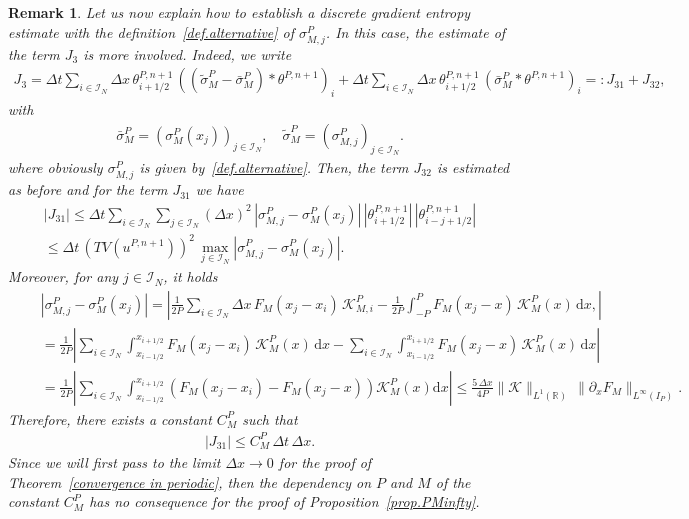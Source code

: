 \documentclass[11pt]{amsart}
\newtheorem{remark}{Remark}
\newcommand{\K}{\mathcal{K}}
\newcommand{\dd}{\mathrm{d}}
\newcommand{\pa}{\partial}
\newcommand{\R}{\mathbb{R}}
\newcommand{\I}{\mathcal{I}_N}
\begin{document}
\begin{remark}\label{rem.alter2}
Let us now explain how to establish a discrete gradient entropy estimate with the definition~\eqref{def.alternative} of $\sigma^P_{M,j}$. In this case, the estimate of the term $J_3$ is more involved. Indeed, we write
\begin{align*}
    J_3 = \Delta t \sum_{i\in\I} \Delta x \, \theta^{P,n+1}_{i+1/2} \, \left( (\widetilde{\sigma}_M^P-\bar{\sigma}^P_M) \ast \theta^{P,n+1}\right)_i +\Delta t \sum_{i\in\I} \Delta x \, \theta^{P,n+1}_{i+1/2} \, \left(\bar{\sigma}^P_M \ast \theta^{P,n+1}\right)_i =: J_{31}+J_{32},
\end{align*}
with
\begin{align*}
\bar{\sigma}_M^P= (\sigma_M^P(x_j))_{j\in\I}, \quad \widetilde{\sigma}_M^P = (\sigma_{M,j}^P)_{j \in \I}.
\end{align*}
where obviously $\sigma^P_{M,j}$ is given by~\eqref{def.alternative}. Then, the term $J_{32}$ is estimated as before and for the term $J_{31}$ we have
\begin{multline*}
|J_{31}| \leq \Delta t  \sum_{i \in \I} \sum_{j\in\I} (\Delta x)^2 \, \left|\sigma^P_{M,j}- \sigma^P_M(x_j)\right|  \, \left|\theta^{P,n+1}_{i+1/2}\right| \, \left|\theta^{P,n+1}_{i-j+1/2}\right|\\ \leq \Delta t \, \left(TV\left(u^{P,n+1}\right)\right)^2 \, \max_{j \in \I} \left|\sigma^P_{M,j}- \sigma^P_M(x_j)\right|.%
\end{multline*}
Moreover, for any $j \in \I$, it holds
\begin{align*}
&\left|\sigma^P_{M,j}- \sigma^P_M(x_j)\right|
=   \left| \frac{1}{2P} \sum_{i\in\I} \Delta x\,  F_M(x_j-x_i) \,\K^P_{M,i} -  
\frac{1}{2P} \int_{-P}^{P} F_M(x_j-x)\,\K^P_M(x) \,  \dd x,\right|\\
\phantom{xx}&= \frac{1}{2P} \left| \sum_{i\in\I} \int_{x_{i-1/2}}^{x_{i+1/2}} F_M(x_j-x_i) \,\K^P_{M}(x)\,  \dd x      
- \sum_{i\in\I}\int_{x_{i-1/2}}^{x_{i+1/2}} F_M(x_j-x)\, \K^P_{M}(x) \, \dd x   \right| \\
\phantom{xx}&= \frac{1}{2P}  \left| \sum_{i\in\I} \int_{x_{i-1/2}}^{x_{i+1/2}} (F_M(x_j-x_i)-F_M(x_j-x))\K^P_{M}(x) \dd x       \right|
\le \frac{5 \, \Delta x}{4P} \|\K\|_{L^1(\R)}\,\|\pa_x F_M\|_{L^\infty(I_P)}. 
\end{align*}
Therefore, there exists a constant $C_M^P$ such that
\begin{align}\label{est_N_NT}
|J_{31}| \leq C_M^P \, \Delta t \, \Delta x.
\end{align}
Since we will first pass to the limit $\Delta x\to 0$ for the proof of Theorem~\ref{convergence in periodic}, then the dependency on $P$ and $M$ of the constant $C_M^P$ has no consequence for the proof of Proposition~\ref{prop.PMinfty}. 
\end{remark}
\end{document}

